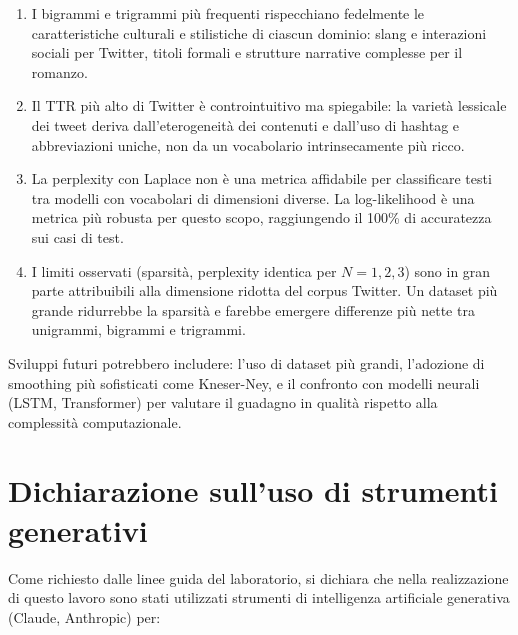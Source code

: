 \documentclass[12pt, a4paper]{article}
\begin{document}
\begin{enumerate}[leftmargin=1.5cm]
    \item I bigrammi e trigrammi più frequenti rispecchiano fedelmente
          le caratteristiche culturali e stilistiche di ciascun dominio:
          slang e interazioni sociali per Twitter, titoli formali e
          strutture narrative complesse per il romanzo.

    \item Il TTR più alto di Twitter è controintuitivo ma spiegabile:
          la varietà lessicale dei tweet deriva dall'eterogeneità dei
          contenuti e dall'uso di hashtag e abbreviazioni uniche,
          non da un vocabolario intrinsecamente più ricco.

    \item La perplexity con Laplace non è una metrica affidabile per
          classificare testi tra modelli con vocabolari di dimensioni
          diverse. La log-likelihood è una metrica più robusta
          per questo scopo, raggiungendo il 100\% di accuratezza
          sui casi di test.

    \item I limiti osservati (sparsità, perplexity identica per $N=1,2,3$)
          sono in gran parte attribuibili alla dimensione ridotta del
          corpus Twitter. Un dataset più grande ridurrebbe la sparsità
          e farebbe emergere differenze più nette tra unigrammi,
          bigrammi e trigrammi.
\end{enumerate}

Sviluppi futuri potrebbero includere: l'uso di dataset più grandi,
l'adozione di smoothing più sofisticati come Kneser-Ney, e il
confronto con modelli neurali (LSTM, Transformer) per valutare
il guadagno in qualità rispetto alla complessità computazionale.

\section*{Dichiarazione sull'uso di strumenti generativi}


Come richiesto dalle linee guida del laboratorio, si dichiara che
nella realizzazione di questo lavoro sono stati utilizzati strumenti
di intelligenza artificiale generativa (Claude, Anthropic) per:
\end{document}
